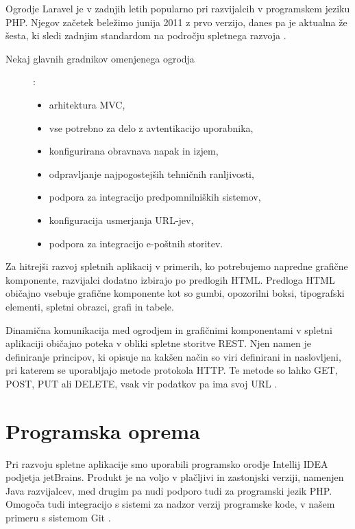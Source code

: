 \documentclass[a4paper, 12pt]{book}
\begin{document}
Ogrodje Laravel je v zadnjih letih popularno pri razvijalcih v programskem jeziku PHP. Njegov začetek beležimo junija 2011 z prvo verzijo, danes pa je aktualna že šesta, ki sledi zadnjim standardom na področju spletnega razvoja \cite{laravel-main-page}. 

\begin{description}
	
	\item[Nekaj glavnih gradnikov omenjenega ogrodja] :
	
	\begin{itemize}
		\item arhitektura MVC,
		\item vse potrebno za delo z avtentikacijo uporabnika,
		\item konfigurirana obravnava napak in izjem,
		\item odpravljanje najpogostejših tehničnih ranljivosti,
		\item podpora za integracijo predpomnilniških sistemov,
		\item konfiguracija usmerjanja URL-jev,
		\item podpora za integracijo e-poštnih storitev.
		
	\end{itemize}
\end{description}

Za hitrejši razvoj spletnih aplikacij v primerih, ko potrebujemo napredne grafične komponente, razvijalci dodatno izbirajo po predlogih HTML. Predloga HTML običajno vsebuje grafične komponente kot so gumbi, opozorilni boksi, tipografski elementi, spletni obrazci, grafi in tabele.

Dinamična komunikacija med ogrodjem in grafičnimi komponentami v spletni aplikaciji običajno poteka v obliki spletne storitve REST. Njen namen je definiranje principov, ki opisuje na kakšen način so viri definirani in naslovljeni, pri katerem se uporabljajo metode protokola HTTP. Te metode so lahko GET, POST, PUT ali DELETE, vsak vir podatkov pa ima svoj URL \cite{protokol-rest}.


\section{Programska oprema}

Pri razvoju spletne aplikacije smo uporabili programsko orodje Intellij IDEA podjetja jetBrains. Produkt je na voljo v plačljivi in zastonjski verziji, namenjen Java razvijalcev, med drugim pa nudi podporo tudi za programski jezik PHP. Omogoča tudi integracijo s sistemi za nadzor verzij programske kode, v našem primeru s sistemom Git \cite{intellij-idea}.
\end{document}
